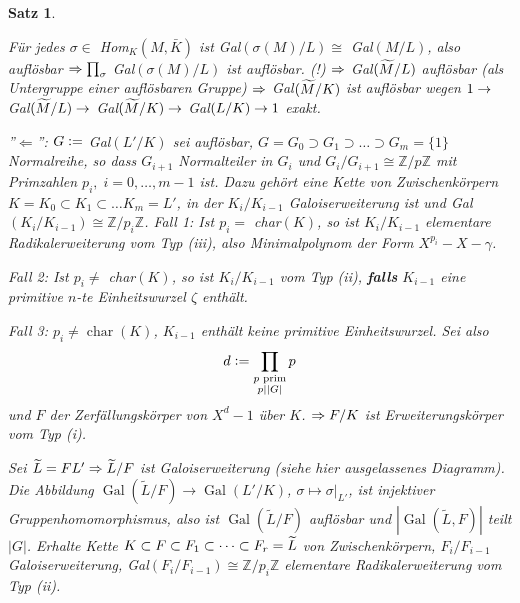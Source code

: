 \documentclass[a4paper,10pt,german]{scrbook}
\theoremstyle{saetze}
\newtheorem{Satz}{Satz}
\theoremstyle{definitionen}
\begin{document}
\begin{Satz}
{\begin{description}
Für jedes $\sigma \in$ Hom$_K(M,\bar K)$ ist Gal$(\sigma(M)/L)
\cong$ Gal$(M/L)$, also auflösbar $\Rightarrow \prod_\sigma$
Gal$(\sigma(M)/L)$ ist auflösbar. (!) $\Rightarrow$ Gal$(\widetilde{M}/L)$
auflösbar (als Untergruppe einer auflösbaren Gruppe) $\Rightarrow$
Gal$(\widetilde{M}/K)$ ist auflösbar wegen $1 \rightarrow$ Gal$(\widetilde{M}/L) \rightarrow$
Gal$(\widetilde{M}/K) \rightarrow$ Gal$(L/K) \rightarrow 1$ exakt.
\end{description}

''$\Leftarrow$'':
\newline $G \mathrel{\mathop:}=$ Gal$(L'/K)$ sei auflösbar, $G
= G_0 \supset G_1 \supset \dots \supset G_m = \{1\}$ Normalreihe, so
dass $G_{i+1}$ Normalteiler in $G_i$ und $G_i/G_{i+1} \cong
\mathbb{Z}/p\mathbb{Z}$ mit Primzahlen $p_i,\;i=0,\dots,m-1$ ist.
\newline \newline Dazu gehört eine Kette von Zwischenkörpern $K = K_0 \subset K_1
\subset \dots K_m = L'$, in der $K_i/K_{i-1}$ Galoiserweiterung ist
und Gal$(K_i/K_{i-1}) \cong \mathbb{Z}/p_i\mathbb{Z}$.
\newline \newline Fall 1: Ist $p_i =$ char$(K)$, so ist $K_i/K_{i-1}$
elementare Radikalerweiterung vom Typ (iii), also Minimalpolynom der Form $X^{p_i}-X-\gamma$.

Fall 2: Ist $p_i \neq$ char$(K)$, so ist $K_i/K_{i-1}$ vom Typ (ii), \textbf{falls}
$K_{i-1}$ eine primitive $n$-te Einheitswurzel $\zeta$ enthält.

Fall 3: $p_i\ne \operatorname{char}(K)$, $K_{i-1}$ enthält keine primitive Einheitswurzel. Sei also \[d \mathrel{\mathop:}= \prod_{\substack{\text{$p$ prim} \\ p \mid |G|}}p\] und $F$ der Zerfällungskörper von $X^d - 1$ über $K$.
$\Rightarrow F/K$ ist Erweiterungskörper vom Typ (i).

Sei $\widetilde{L} = F L' \Rightarrow \widetilde{L}/F$ ist Galoiserweiterung (siehe
hier ausgelassenes Diagramm). Die Abbildung $\operatorname{Gal}(\tilde L/F) \to \operatorname{Gal}(L' / K)$, $\sigma \mapsto \sigma|_{L'}$, ist injektiver Gruppenhomomorphismus, also ist $\operatorname{Gal}(\tilde L/F)$ auflösbar und $|\operatorname{Gal}(\tilde L,F)|$ teilt $|G|$. Erhalte Kette $K \subset F \subset F_1 \subset \dots \subset
F_r = \widetilde{L}$ von Zwischenkörpern, $F_i/F_{i-1}$ Galoiserweiterung,
Gal$(F_i/F_{i-1}) \cong \mathbb{Z}/p_i\mathbb{Z}$ elementare
Radikalerweiterung vom Typ (ii).}
\end{Satz}

\end{document}
